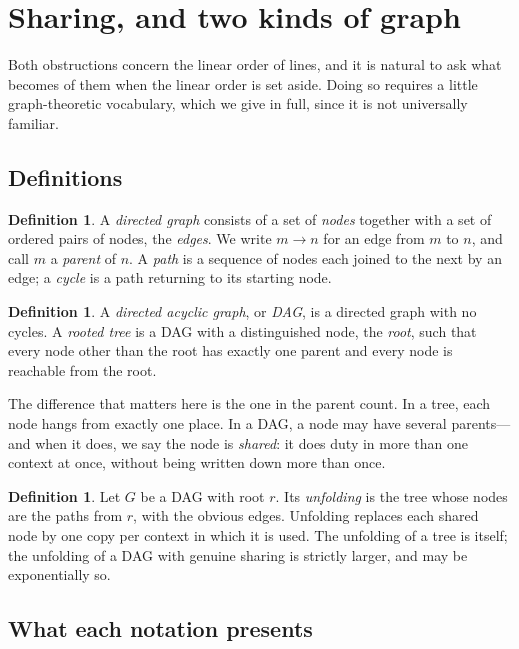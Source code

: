 \documentclass[11pt]{article}
\theoremstyle{plain}
\theoremstyle{definition}
\newtheorem{definition}[theorem]{Definition}
\theoremstyle{remark}
\begin{document}
\section{Sharing, and two kinds of graph}\label{sec:trees}

Both obstructions concern the linear order of lines, and it is natural to ask
what becomes of them when the linear order is set aside. Doing so requires a
little graph-theoretic vocabulary, which we give in full, since it is not
universally familiar.

\subsection{Definitions}

\begin{definition}
A \emph{directed graph} consists of a set of \emph{nodes} together with a set
of ordered pairs of nodes, the \emph{edges}. We write $m \to n$ for an edge
from $m$ to $n$, and call $m$ a \emph{parent} of $n$. A \emph{path} is a
sequence of nodes each joined to the next by an edge; a \emph{cycle} is a path
returning to its starting node.
\end{definition}

\begin{definition}
A \emph{directed acyclic graph}, or \emph{DAG}, is a directed graph with no
cycles. A \emph{rooted tree} is a DAG with a distinguished node, the
\emph{root}, such that every node other than the root has exactly one parent
and every node is reachable from the root.
\end{definition}

The difference that matters here is the one in the parent count. In a tree,
each node hangs from exactly one place. In a DAG, a node may have several
parents---and when it does, we say the node is \emph{shared}: it does duty in
more than one context at once, without being written down more than once.

\begin{definition}
Let $G$ be a DAG with root $r$. Its \emph{unfolding} is the tree whose nodes
are the paths from $r$, with the obvious edges. Unfolding replaces each shared
node by one copy per context in which it is used. The unfolding of a tree is
itself; the unfolding of a DAG with genuine sharing is strictly larger, and
may be exponentially so.
\end{definition}

\subsection{What each notation presents}
\end{document}
